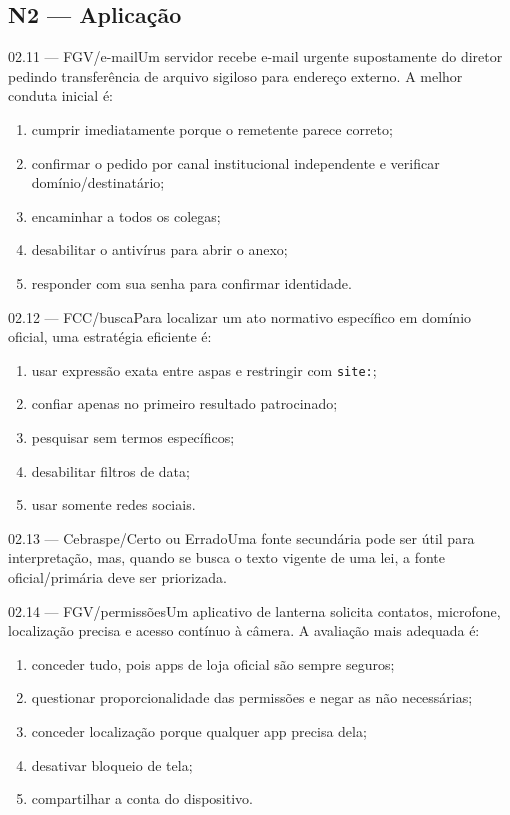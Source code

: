 \subsection*{N2 — Aplicação}
\begin{questao}{ 02.11 — FGV/e-mail}Um servidor recebe e-mail urgente supostamente do diretor pedindo transferência de arquivo sigiloso para endereço externo. A melhor conduta inicial é:\begin{enumerate}[label=\Alph*)]\item cumprir imediatamente porque o remetente parece correto;\item confirmar o pedido por canal institucional independente e verificar domínio/destinatário;\item encaminhar a todos os colegas;\item desabilitar o antivírus para abrir o anexo;\item responder com sua senha para confirmar identidade.\end{enumerate}\end{questao}
\begin{questao}{ 02.12 — FCC/busca}Para localizar um ato normativo específico em domínio oficial, uma estratégia eficiente é:\begin{enumerate}[label=\Alph*)]\item usar expressão exata entre aspas e restringir com \texttt{site:};\item confiar apenas no primeiro resultado patrocinado;\item pesquisar sem termos específicos;\item desabilitar filtros de data;\item usar somente redes sociais.\end{enumerate}\end{questao}
\begin{questao}{ 02.13 — Cebraspe/Certo ou Errado}Uma fonte secundária pode ser útil para interpretação, mas, quando se busca o texto vigente de uma lei, a fonte oficial/primária deve ser priorizada.\end{questao}
\begin{questao}{ 02.14 — FGV/permissões}Um aplicativo de lanterna solicita contatos, microfone, localização precisa e acesso contínuo à câmera. A avaliação mais adequada é:\begin{enumerate}[label=\Alph*)]\item conceder tudo, pois apps de loja oficial são sempre seguros;\item questionar proporcionalidade das permissões e negar as não necessárias;\item conceder localização porque qualquer app precisa dela;\item desativar bloqueio de tela;\item compartilhar a conta do dispositivo.\end{enumerate}\end{questao}
